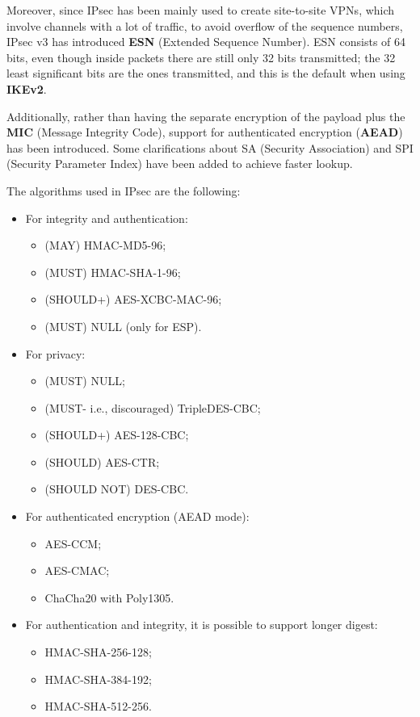 Moreover, since IPsec has been mainly used to create site-to-site VPNs, which involve channels with a lot of traffic, to avoid overflow of the sequence numbers, IPsec v3 has introduced \textbf{ESN} (Extended Sequence Number). ESN consists of 64 bits, even though inside packets there are still only 32 bits transmitted; the 32 least significant bits are the ones transmitted, and this is the default when using \textbf{IKEv2}.

Additionally, rather than having the separate encryption of the payload plus the \textbf{MIC} (Message Integrity Code), support for authenticated encryption (\textbf{AEAD}) has been introduced. Some clarifications about SA (Security Association) and SPI (Security Parameter Index) have been added to achieve faster lookup.

The algorithms used in IPsec are the following:
\begin{itemize}
    \item For integrity and authentication:
          \begin{itemize}
              \item (MAY) HMAC-MD5-96;
              \item (MUST) HMAC-SHA-1-96;
              \item (SHOULD+) AES-XCBC-MAC-96;
              \item (MUST) NULL (only for ESP).
          \end{itemize}

    \item For privacy:
          \begin{itemize}
              \item (MUST) NULL;
              \item (MUST- i.e., discouraged) TripleDES-CBC;
              \item (SHOULD+) AES-128-CBC;
              \item (SHOULD) AES-CTR;
              \item (SHOULD NOT) DES-CBC.
          \end{itemize}

    \item For authenticated encryption (AEAD mode):
          \begin{itemize}
              \item AES-CCM;
              \item AES-CMAC;
              \item ChaCha20 with Poly1305.
          \end{itemize}

    \item For authentication and integrity, it is possible to support longer digest:
          \begin{itemize}
              \item HMAC-SHA-256-128;
              \item HMAC-SHA-384-192;
              \item HMAC-SHA-512-256.
          \end{itemize}
\end{itemize}


